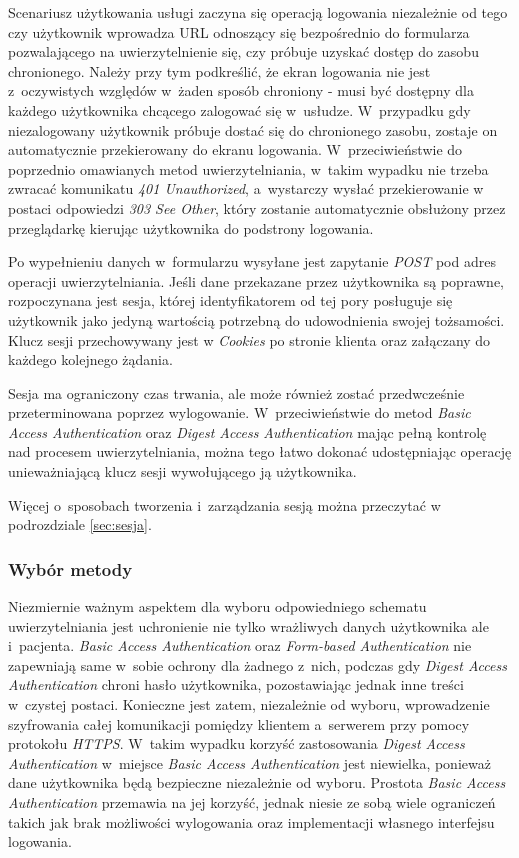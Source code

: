 \documentclass[11pt]{aghdpl}
\begin{document}
Scenariusz użytkowania usługi zaczyna się operacją logowania niezależnie od tego czy użytkownik wprowadza URL odnoszący się bezpośrednio do formularza pozwalającego na uwierzytelnienie się, czy próbuje uzyskać dostęp do zasobu chronionego. Należy przy tym podkreślić, że ekran logowania nie jest z~oczywistych względów w~żaden sposób chroniony - musi być dostępny dla każdego użytkownika chcącego zalogować się w~usłudze. W~przypadku gdy niezalogowany użytkownik próbuje dostać się do chronionego zasobu, zostaje on automatycznie przekierowany do ekranu logowania. W~przeciwieństwie do poprzednio omawianych metod uwierzytelniania, w~takim wypadku nie trzeba zwracać komunikatu \emph{401 Unauthorized}, a~wystarczy wysłać przekierowanie w postaci odpowiedzi \emph{303 See Other}, który zostanie automatycznie obsłużony przez przeglądarkę kierując użytkownika do podstrony logowania.

Po wypełnieniu danych w~formularzu wysyłane jest zapytanie \emph{POST} pod adres operacji uwierzytelniania. Jeśli dane przekazane przez użytkownika są poprawne, rozpoczynana jest sesja, której identyfikatorem od tej pory posługuje się użytkownik jako jedyną wartością potrzebną do udowodnienia swojej tożsamości. Klucz sesji przechowywany jest w \emph{Cookies} po stronie klienta oraz załączany do każdego kolejnego żądania.

Sesja ma ograniczony czas trwania, ale może również zostać przedwcześnie przeterminowana poprzez wylogowanie. W~przeciwieństwie do metod \emph{Basic Access Authentication} oraz \emph{Digest Access Authentication} mając pełną kontrolę nad procesem uwierzytelniania, można tego łatwo dokonać udostępniając operację unieważniającą klucz sesji wywołującego ją użytkownika.

Więcej o~sposobach tworzenia i~zarządzania sesją można przeczytać w podrozdziale \ref{sec:sesja}.

\subsubsection{Wybór metody}

Niezmiernie ważnym aspektem dla wyboru odpowiedniego schematu uwierzytelniania jest uchronienie nie tylko wrażliwych danych użytkownika ale i~pacjenta. \emph{Basic Access Authentication} oraz \emph{Form-based Authentication} nie zapewniają same w~sobie ochrony dla żadnego z~nich, podczas gdy \emph{Digest Access Authentication} chroni hasło użytkownika, pozostawiając jednak inne treści w~czystej postaci. Konieczne jest zatem, niezależnie od wyboru, wprowadzenie szyfrowania całej komunikacji pomiędzy klientem a~serwerem przy pomocy protokołu \emph{HTTPS}. W~takim wypadku korzyść zastosowania \emph{Digest Access Authentication} w~miejsce \emph{Basic Access Authentication} jest niewielka, ponieważ dane użytkownika będą bezpieczne niezależnie od wyboru. Prostota \emph{Basic Access Authentication} przemawia na jej korzyść, jednak niesie ze sobą wiele ograniczeń takich jak brak możliwości wylogowania oraz implementacji własnego interfejsu logowania.
\end{document}
